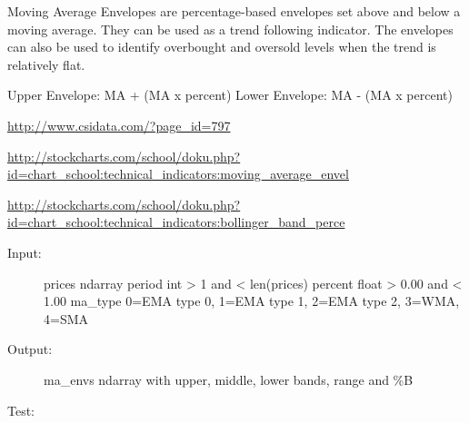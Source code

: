 \documentclass[letterpaper,10pt,english]{sphinxmanual}
\begin{document}
\begin{fulllineitems}
\label{reference:technical_indicators.technical_indicators.ma_env}
Moving Average Envelopes are percentage-based envelopes set above and below
a moving average.
They can be used as a trend following indicator.
The envelopes can also be used to identify overbought and oversold levels
when the trend is relatively flat.

Upper Envelope: MA + (MA x percent)
Lower Envelope: MA - (MA x percent)

\href{http://www.csidata.com/?page\_id=797}{http://www.csidata.com/?page\_id=797}

\href{http://stockcharts.com/school/doku.php?id=chart\_school:technical\_indicators:moving\_average\_envel}{http://stockcharts.com/school/doku.php?id=chart\_school:technical\_indicators:moving\_average\_envel}

\href{http://stockcharts.com/school/doku.php?id=chart\_school:technical\_indicators:bollinger\_band\_perce}{http://stockcharts.com/school/doku.php?id=chart\_school:technical\_indicators:bollinger\_band\_perce}
\begin{description}
\item[{Input:}] \leavevmode
prices ndarray
period int \textgreater{} 1 and \textless{} len(prices)
percent float \textgreater{} 0.00 and \textless{} 1.00
ma\_type 0=EMA type 0, 1=EMA type 1, 2=EMA type 2, 3=WMA, 4=SMA

\item[{Output:}] \leavevmode
ma\_envs ndarray with upper, middle, lower bands, range and \%B

\end{description}

Test:


\end{fulllineitems}
\end{document}
